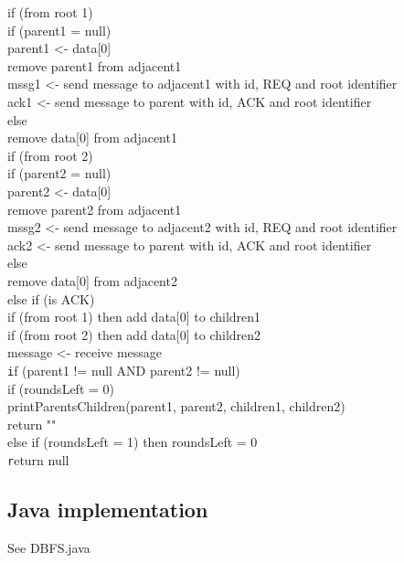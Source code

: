\documentclass[12pt,letterpaper]{article}
\begin{document}
{\hphantom{~~~~~~~~} if (from root 1) \\
\hphantom{~~~~~~~~~~~~} if (parent1 = null) \\
\hphantom{~~~~~~~~~~~~~~~~} parent1 <- data[0] \\
\hphantom{~~~~~~~~~~~~~~~~} remove parent1 from adjacent1 \\
\hphantom{~~~~~~~~~~~~~~~~} mssg1 <- send message to adjacent1 with id, REQ and root identifier \\
\hphantom{~~~~~~~~~~~~~~~~} ack1 <- send message to parent with id, ACK and root identifier \\
\hphantom{~~~~~~~~~~~~} else  \\
\hphantom{~~~~~~~~~~~~~~~~} remove data[0] from adjacent1 \\
\hphantom{~~~~~~~~} if (from root 2) \\
\hphantom{~~~~~~~~~~~~} if (parent2 = null) \\
\hphantom{~~~~~~~~~~~~~~~~} parent2 <- data[0] \\
\hphantom{~~~~~~~~~~~~~~~~} remove parent2 from adjacent1 \\
\hphantom{~~~~~~~~~~~~~~~~} mssg2 <- send message to adjacent2 with id, REQ and root identifier \\
\hphantom{~~~~~~~~~~~~~~~~} ack2 <- send message to parent with id, ACK and root identifier \\
\hphantom{~~~~~~~~~~~~} else  \\
\hphantom{~~~~~~~~~~~~~~~~} remove data[0] from adjacent2 \\
\hphantom{~~~~} else if (is ACK) \\
\hphantom{~~~~~~~~} if (from root 1) then add data[0] to children1 \\
\hphantom{~~~~~~~~} if (from root 2) then add data[0] to children2 \\
\hphantom{~~~~} message <- receive message \\
\texttt if (parent1 != null AND parent2 != null) \\
\hphantom{~~~~} if (roundsLeft = 0) \\
\hphantom{~~~~~~~~} printParentsChildren(parent1, parent2, children1, children2) \\
\hphantom{~~~~~~~~} return "" \\
\hphantom{~~~~} else if (roundsLeft = 1) then roundsLeft = 0 \\
\texttt return null} \\

\subsection* {Java implementation}
See DBFS.java
\end{document}
